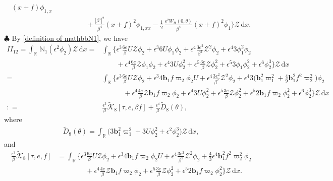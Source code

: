 \documentclass[10pt, reqno]{amsart}
\numberwithin{equation}{section}
\theoremstyle{definition}
\begin{document}
{\begin{align*}
(x+f) \phi_{1,x}
\nonumber\\[2mm]
&
\qquad\qquad + \frac{|\beta'|^2}{\beta^4}(x+f)^2 \phi_{1,xx}
-\frac{1}{2}\, \frac{\epsilon^2W_{tt}(0, \theta)}{\beta^4} (x+f)^2\phi_{1}
\Bigg\} {\mathcal Z} \,{\mathrm d}x.
\end{align*}
\smallskip\noindent
$\clubsuit$
By \eqref{definition of mathbbN1}, we have
\begin{align} \label{N1phi2 intergral Z}
II_{12}
=\int_{\mathbb R}\, \mathbb{N}_1 (\epsilon^2 \phi_2) \mathcal Z \,{\mathrm d}x
= & \int_{\mathbb R} \Bigg\{
 \epsilon^3 \frac{6e}{\beta}U{\mathcal Z}\phi_2 + \epsilon^3 6 U\phi_1\phi_2
+\epsilon^4 \frac{3e^2}{\beta^2}{\mathcal Z}^2\phi_2 +\epsilon^4 3\phi_1^2\phi_2
\nonumber\\[2mm]
&\qquad
+\epsilon^4 \frac{6e}{\beta}{\mathcal Z}\phi_1\phi_2 + \epsilon^4 3U \phi_2^2
+\epsilon^5 \frac{3e}{\beta}{\mathcal Z}\phi_2^2 + \epsilon^5 3\phi_1 \phi_2^2
+\epsilon^6 \phi_2^3 \Bigg\} \mathcal Z \,{\mathrm d}x
\nonumber\\[2mm]
 =& \int_{\mathbb R} \Bigg\{
 \epsilon^3 \frac{6e}{\beta}U{\mathcal Z}\phi_2 + \epsilon^3 4 {\mathbf b}_1 f\varpi_2\phi_2 U
+\epsilon^4 \frac{3e^2}{\beta^2}{\mathcal Z}^2\phi_2 +\epsilon^4 3 \big({\mathbf b}_1^2 \varpi_1^2 + \frac 49{\mathbf b}_1^2 f^2 \varpi_2^2 \big) \phi_2
\nonumber\\[2mm]
&\quad
\qquad +\epsilon^4 \frac{4e}{\beta}{\mathcal Z}{\mathbf b}_1 f \varpi_2\phi_2 + \epsilon^4 3U \phi_2^2 +\epsilon^5 \frac{3e}{\beta}{\mathcal Z}\phi_2^2 + \epsilon^5 2 {\mathbf b}_1 f \varpi_2 \phi_2^2
+\epsilon^6 \phi_2^3 \Bigg\} \mathcal Z \,{\mathrm d}x
\nonumber\\[2mm]
: = & \frac{\epsilon^3}{\beta}\tilde{\mathcal K}_8\left[\tau, e, {\beta f}\right] +  \frac{\epsilon^4}{\beta}\tilde {D}_8(\theta),
\end{align}
where
\begin{align*}
\tilde {D}_8 (\theta) = \int_{\mathbb R} \Big( 3 {\mathbf b}_1^2 \varpi_1^2 +  3U \phi_2^2 +\epsilon^2 \phi_2^3 \Big) \mathcal Z \,{\mathrm d}x,
\end{align*}
and
\begin{align*}
\frac{\epsilon^3}{\beta}\tilde{\mathcal K}_8\left[\tau, e, { f}\right] & = \int_{\mathbb R} \Bigg\{
 \epsilon^3 \frac{6e}{\beta}U{\mathcal Z}\phi_2 + \epsilon^3 4 {\mathbf b}_1 f\varpi_2\phi_2 U
+\epsilon^4 \frac{3e^2}{\beta^2}{\mathcal Z}^2\phi_2 + \frac 43 \epsilon^4 {\mathbf b}_1^2 f^2 \varpi_2^2 \phi_2
\nonumber\\[2mm]
&\qquad
\qquad +\epsilon^4 \frac{4e}{\beta}{\mathcal Z}{\mathbf b}_1 f \varpi_2\phi_2 +\epsilon^5 \frac{3e}{\beta}{\mathcal Z}\phi_2^2 + \epsilon^5 2 {\mathbf b}_1 f \varpi_2 \phi_2^2
 \Bigg\} \mathcal Z \,{\mathrm d}x.
\end{align*}


}
\end{document}
